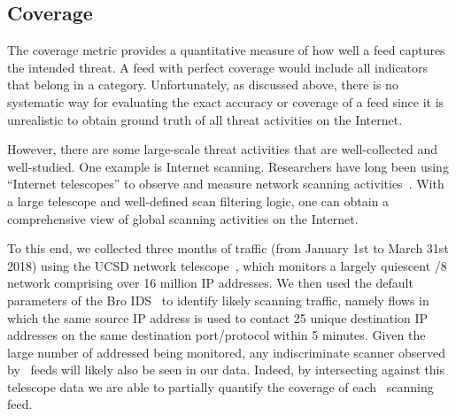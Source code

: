 \subsection{Coverage}
\label{sec:completeness}

The coverage metric provides a quantitative measure of how well a
feed captures the intended threat. A feed with perfect
coverage would include all indicators that belong in a category.
Unfortunately, as discussed above, there is no systematic way for
evaluating the exact accuracy or coverage of a feed since it is unrealistic
to obtain ground truth of all threat activities on the Internet.

However, there are some large-scale threat activities that are
well-collected and well-studied. One example is Internet
scanning. Researchers have long been using ``Internet telescopes'' to
observe and measure network scanning
activities~\cite{benson2015leveraging, durumeric2014internet,
  pang2004characteristics}.  With a large telescope and well-defined
scan filtering logic, one can obtain a comprehensive view of global
scanning activities on the Internet.

To this end, we collected three months of traffic (from January 1st to
March 31st 2018) using the UCSD network telescope~\cite{telescope},
which monitors a largely quiescent /8 network comprising over 16
million IP addresses.  We then used the default parameters of the Bro
IDS~\cite{BroNetwork} to identify likely scanning traffic, namely
flows in which the same source IP address is used to contact 25 unique
destination IP addresses on the same destination port/protocol within
5 minutes. Given the large number of addressed being monitored, any
indiscriminate scanner observed by \ti\ feeds will likely also be seen
in our data.  Indeed, by intersecting against this telescope data we
are able to partially quantify the coverage of each \ti\ scanning feed.



